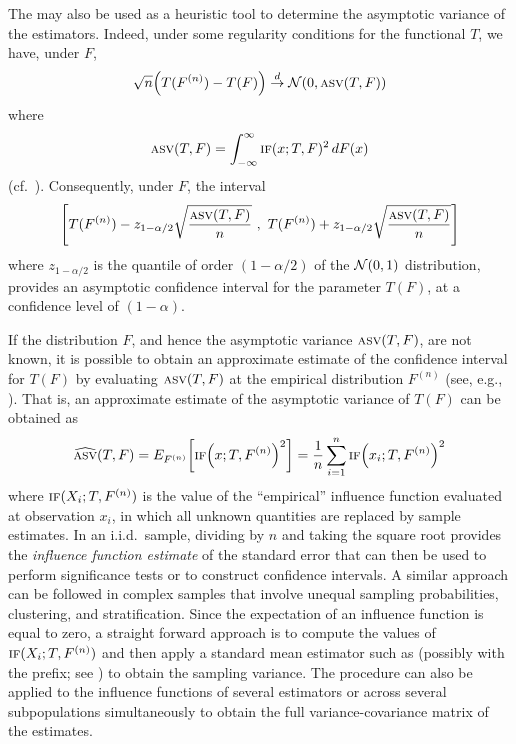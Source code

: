 The  may also be used as a heuristic tool to determine the
asymptotic variance of the estimators. Indeed, under some regularity conditions
for the functional $T$, we have, under $F$,                                    
\[
    \sqrt{n}\left(T(F^{(n)}) - T(F)\right) \stackrel{d}\rightarrow \mathcal{N}\left(0, \stsc{ASV}(T, F)\right)
\]
where
\begin{equation}\label{eq:ASV}
    \stsc{ASV}(T, F) = \int_{-\infty}^\infty \stsc{IF}(x; T, F)^2 \dif F(x)
\end{equation}
(cf.\ \citealp[p. 85 and 226]{hampel:etal:1986}). Consequently, under $F$, the
interval
\[
    \left[ T(F^{(n)}) - z_{1-\alpha/2} \sqrt{\frac{\stsc{ASV}(T, F)}{n}}\ ,\  
           T(F^{(n)}) + z_{1-\alpha/2} \sqrt{\frac{\stsc{ASV}(T, F)}{n}}\right]
\]
where $z_{1-\alpha/2}$ is the quantile of order $(1-\alpha/2)$ of the ${\cal
N}(0,1)$ distribution, provides an asymptotic confidence interval for the
parameter $T(F)$, at a confidence level of $(1-\alpha)$. 

If the distribution $F$, and hence the asymptotic variance $\stsc{ASV}(T, F)$,
are not known, it is possible to obtain an approximate estimate of the confidence
interval for $T(F)$ by evaluating $\stsc{ASV}(T, F)$ at the empirical distribution 
$F^{(n)}$ (see, e.g., \citealp[79-81]{staudte:sheather:1990}). That is, an 
approximate estimate of the asymptotic variance of $T(F)$ can be obtained as
\[
    \widehat{\stsc{ASV}}(T, F) = E_{F^{(n)}}\left[\stsc{IF}\left(x; T, F^{(n)}\right)^2\right] = 
    \frac{1}{n} \sum_{i=1}^n \stsc{IF}\left(x_i; T, F^{(n)}\right)^2
\]
where $\stsc{IF}(X_i; T, F^{(n)})$ is the value of the “empirical” influence
function evaluated at observation $x_i$, in which all unknown quantities are
replaced by sample estimates. In an i.i.d.\ sample, dividing by $n$ and taking
the square root provides the \emph{influence function estimate} of the standard
error \citep[79]{staudte:sheather:1990} that can then be used to perform
significance tests or to construct confidence intervals. A similar approach can
be followed in complex samples that involve unequal sampling probabilities,
clustering, and stratification. Since the expectation of an influence function
is equal to zero, a straight forward approach is to compute the values of
$\stsc{IF}(X_i; T, F^{(n)})$ and then apply a standard mean estimator such as
\rref{mean} (possibly with the \stcmd{svy} prefix; see \rref{svy estimation})
to obtain the sampling variance. The procedure can also be applied to the
influence functions of several estimators or across several subpopulations
simultaneously to obtain the full variance-covariance matrix of the estimates.

